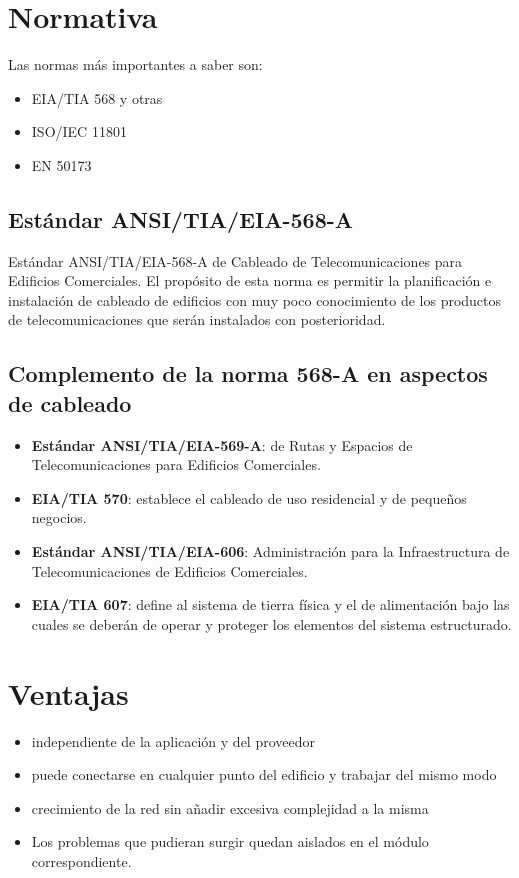 \documentclass[11pt]{article}
\begin{document}
\section{Normativa}
\label{sec:org3499029}
Las normas más importantes a saber son:
\begin{itemize}
\item EIA/TIA 568 y otras
\item ISO/IEC 11801
\item EN 50173
\end{itemize}

\subsection{Estándar ANSI/TIA/EIA-568-A}
\label{sec:org8446c8b}
Estándar ANSI/TIA/EIA-568-A de Cableado de Telecomunicaciones para Edificios Comerciales. El propósito de esta norma es permitir la planificación e instalación de cableado de edificios
con muy poco conocimiento de los productos de telecomunicaciones que serán instalados con posterioridad.

\subsection{Complemento de la norma 568-A en aspectos de cableado}
\label{sec:orgd32fd96}
\begin{itemize}
\item \textbf{Estándar ANSI/TIA/EIA-569-A}: de Rutas y Espacios de Telecomunicaciones para Edificios Comerciales.
\item \textbf{EIA/TIA 570}: establece el cableado de uso residencial y de pequeños negocios.
\item \textbf{Estándar ANSI/TIA/EIA-606}: Administración para la Infraestructura de Telecomunicaciones de Edificios Comerciales.
\item \textbf{EIA/TIA 607}: define al sistema de tierra física y el de alimentación bajo las cuales se deberán de operar y proteger los elementos del sistema estructurado.
\end{itemize}

\section{Ventajas}
\label{sec:org7d5aa9a}
\begin{itemize}
\item independiente de la aplicación y del proveedor
\item puede conectarse en cualquier punto del edificio y trabajar del mismo modo
\item crecimiento de la red sin añadir excesiva complejidad a la misma
\item Los problemas que pudieran surgir quedan aislados en el módulo correspondiente.
\end{itemize}
\end{document}
